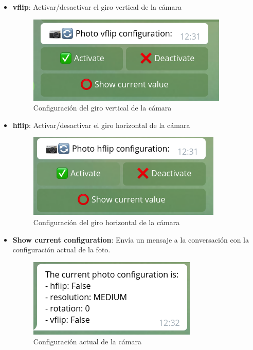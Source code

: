 \begin{itemize}
\begin{itemize}
\item \textbf{vflip}: Activar/desactivar el giro vertical de la cámara

\begin{figure}[H]
	\centering
	\includegraphics[scale=0.4]{images/73}
	\caption{Configuración del giro vertical de la cámara}
\end{figure}

\newpage

\item \textbf{hflip}: Activar/desactivar el giro horizontal de la cámara

\begin{figure}[H]
	\centering
	\includegraphics[scale=0.4]{images/74}
	\caption{Configuración del giro horizontal de la cámara}
\end{figure}

\item \textbf{Show current configuration}: Envía un mensaje a la conversación con la configuración actual de la foto.

\begin{figure}[H]
	\centering
	\includegraphics[scale=0.4]{images/75}
	\caption{Configuración actual de la cámara}
\end{figure}

\end{itemize}


\end{itemize}
